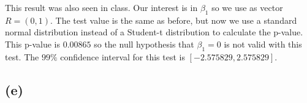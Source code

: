 \documentclass[a4paper]{article}
\begin{document}
\noindent {}
This result was also seen in class. Our interest is in $\beta_1$ so we use as vector $R=(0,1)$. The test value is the same as before, but now we use a standard normal distribution instead of a Student-t distribution to calculate the p-value. This p-value is $0.00865$ so the null hypothesis that $\beta_1=0$ is not valid with this test. The $99\%$ confidence interval for this test is $[-2.575829, 2.575829]$.

\subsection*{(e)}
\noindent {}
\end{document}
